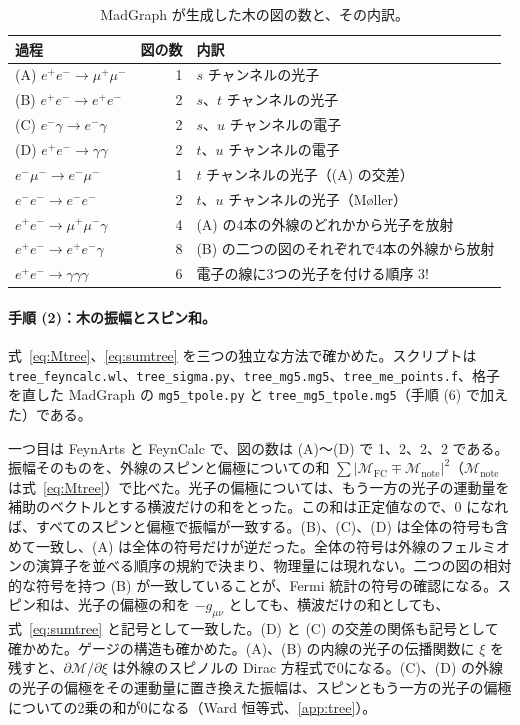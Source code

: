 \documentclass[a4paper,10pt]{ltjsarticle}
\begin{document}
\begin{table}[tbp]
\centering\small
\caption{MadGraph が生成した木の図の数と、その内訳。}
\label{tab:diagrams}
\begin{tabular}{lrl}
\toprule
過程 & 図の数 & 内訳 \\
\midrule
(A) $e^+e^-\to\mu^+\mu^-$ & 1 & $s$ チャンネルの光子 \\
(B) $e^+e^-\to e^+e^-$ & 2 & $s$、$t$ チャンネルの光子 \\
(C) $e^-\gamma\to e^-\gamma$ & 2 & $s$、$u$ チャンネルの電子 \\
(D) $e^+e^-\to\gamma\gamma$ & 2 & $t$、$u$ チャンネルの電子 \\
$e^-\mu^-\to e^-\mu^-$ & 1 & $t$ チャンネルの光子（(A) の交差） \\
$e^-e^-\to e^-e^-$ & 2 & $t$、$u$ チャンネルの光子（M{\o}ller） \\
$e^+e^-\to\mu^+\mu^-\gamma$ & 4 & (A) の4本の外線のどれかから光子を放射 \\
$e^+e^-\to e^+e^-\gamma$ & 8 & (B) の二つの図のそれぞれで4本の外線から放射 \\
$e^+e^-\to\gamma\gamma\gamma$ & 6 & 電子の線に3つの光子を付ける順序 $3!$ \\
\bottomrule
\end{tabular}
\end{table}

\paragraph{手順 (2)：木の振幅とスピン和。}式~\eqref{eq:Mtree}、\eqref{eq:sumtree} を三つの独立な方法で確かめた。スクリプトは \texttt{tree\_feyncalc.wl}、\texttt{tree\_sigma.py}、\texttt{tree\_mg5.mg5}、\texttt{tree\_me\_points.f}、格子を直した MadGraph の \texttt{mg5\_tpole.py} と \texttt{tree\_mg5\_tpole.mg5}（手順 (6) で加えた）である。

一つ目は FeynArts と FeynCalc で、図の数は (A)〜(D) で 1、2、2、2 である。振幅そのものを、外線のスピンと偏極についての和 $\sum|\mathcal M_{\mathrm{FC}}\mp\mathcal M_{\mathrm{note}}|^2$（$\mathcal M_{\mathrm{note}}$ は式~\eqref{eq:Mtree}）で比べた。光子の偏極については、もう一方の光子の運動量を補助のベクトルとする横波だけの和をとった。この和は正定値なので、0 になれば、すべてのスピンと偏極で振幅が一致する。(B)、(C)、(D) は全体の符号も含めて一致し、(A) は全体の符号だけが逆だった。全体の符号は外線のフェルミオンの演算子を並べる順序の規約で決まり、物理量には現れない。二つの図の相対的な符号を持つ (B) が一致していることが、Fermi 統計の符号の確認になる。スピン和は、光子の偏極の和を $-g_{\mu\nu}$ としても、横波だけの和としても、式~\eqref{eq:sumtree} と記号として一致した。(D) と (C) の交差の関係も記号として確かめた。ゲージの構造も確かめた。(A)、(B) の内線の光子の伝播関数に $\xi$ を残すと、$\partial\mathcal M/\partial\xi$ は外線のスピノルの Dirac 方程式で0になる。(C)、(D) の外線の光子の偏極をその運動量に置き換えた振幅は、スピンともう一方の光子の偏極についての2乗の和が0になる（Ward 恒等式、\ref{app:tree}）。
\end{document}
